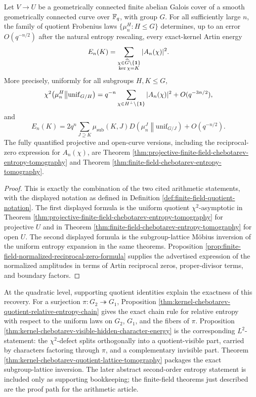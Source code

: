 \begin{theorem}\label{thm:intro-main-arithmetic-tomography}
Let \(V\to U\) be a geometrically connected finite \etale{} abelian Galois cover of a smooth geometrically connected curve over \(\mathbb{F}_q\), with group \(G\). For all sufficiently large \(n\), the family of quotient Frobenius laws \(\{\mu_n^H:H\le G\}\) determines, up to an error \(O(q^{-n/2})\) after the natural entropy rescaling, every exact-kernel Artin energy
\[
E_n(K)=\sum_{\substack{\chi\in\widehat G\setminus\{\mathbf{1}\}\\ \ker\chi=K}}|A_n(\chi)|^2.
\]
More precisely, uniformly for all subgroups \(H,K\le G\),
\[
\chi^2\!\left(\mu_n^H\middle\|\mathrm{unif}_{G/H}\right)
=q^{-n}\sum_{\chi\in H^\perp\setminus\{\mathbf{1}\}}|A_n(\chi)|^2+O(q^{-3n/2}),
\]
and
\[
E_n(K)=2q^n\sum_{J\supseteq K}\mu_{\mathrm{sub}}(K,J)
D\!\left(\mu_n^J\middle\|\mathrm{unif}_{G/J}\right)+O(q^{-n/2}).
\]
The fully quantified projective and open-curve versions, including the reciprocal-zero expression for \(A_n(\chi)\), are Theorem \ref{thm:projective-finite-field-chebotarev-entropy-tomography} and Theorem \ref{thm:finite-field-chebotarev-entropy-tomography}.
\end{theorem}

\begin{proof}
This is exactly the combination of the two cited arithmetic statements, with the displayed notation as defined in Definition \ref{def:finite-field-quotient-notation}. The first displayed formula is the uniform quotient \(\chi^2\)-asymptotic in Theorem \ref{thm:projective-finite-field-chebotarev-entropy-tomography} for projective \(U\) and in Theorem \ref{thm:finite-field-chebotarev-entropy-tomography} for open \(U\). The second displayed formula is the subgroup-lattice M\"obius inversion of the uniform entropy expansion in the same theorems. Proposition \ref{prop:finite-field-normalized-reciprocal-zero-formula} supplies the advertised expression of the normalized amplitudes in terms of Artin reciprocal zeros, proper-divisor terms, and boundary factors.
\end{proof}

At the quadratic level, supporting quotient identities explain the exactness of this recovery. For a surjection \(\pi:G_2\twoheadrightarrow G_1\), Proposition \ref{thm:kernel-chebotarev-quotient-relative-entropy-chain} gives the exact chain rule for relative entropy with respect to the uniform laws on \(G_2\), \(G_1\), and the fibers of \(\pi\). Proposition \ref{thm:kernel-chebotarev-visible-hidden-character-energy} is the corresponding \(L^2\)-statement: the \(\chi^2\)-defect splits orthogonally into a quotient-visible part, carried by characters factoring through \(\pi\), and a complementary invisible part. Theorem \ref{thm:kernel-chebotarev-quotient-lattice-tomography} packages the exact subgroup-lattice inversion. The later abstract second-order entropy statement is included only as supporting bookkeeping; the finite-field theorems just described are the proof path for the arithmetic article.

